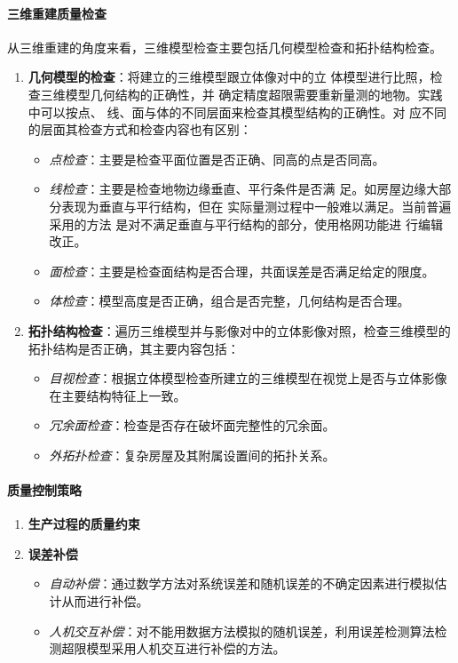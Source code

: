 \paragraph{三维重建质量检查}从三维重建的角度来看，三维模型检查主要包括几何模型检查和拓扑结构检查。
\begin{enumerate}
	\item \textbf{几何模型的检查}：将建立的三维模型跟立体像对中的立
		体模型进行比照，检查三维模型几何结构的正确性，并
		确定精度超限需要重新量测的地物。实践中可以按点、
		线、面与体的不同层面来检查其模型结构的正确性。对
		应不同的层面其检查方式和检查内容也有区别：
		\begin{itemize}
			\item \textit{点检查}：主要是检查平面位置是否正确、同高的点是否同高。
			\item \textit{线检查}：主要是检查地物边缘垂直、平行条件是否满
				足。如房屋边缘大部分表现为垂直与平行结构，但在
				实际量测过程中一般难以满足。当前普遍采用的方法
				是对不满足垂直与平行结构的部分，使用格网功能进
				行编辑改正。
			\item \textit{面检查}：主要是检查面结构是否合理，共面误差是否满足给定的限度。
			\item \textit{体检查}：模型高度是否正确，组合是否完整，几何结构是否合理。
		\end{itemize}
	\item \textbf{拓扑结构检查}：遍历三维模型并与影像对中的立体影像对照，检查三维模型的拓扑结构是否正确，其主要内容包括：
		\begin{itemize}
			\item \textit{目视检查}：根据立体模型检查所建立的三维模型在视觉上是否与立体影像在主要结构特征上一致。
			\item \textit{冗余面检查}：检查是否存在破坏面完整性的冗余面。
			\item \textit{外拓扑检查}：复杂房屋及其附属设置间的拓扑关系。
		\end{itemize}
\end{enumerate}

\paragraph{质量控制策略}
\begin{enumerate}
	\item \textbf{生产过程的质量约束}
	\item \textbf{误差补偿}
		\begin{itemize}
			\item \textit{自动补偿}：通过数学方法对系统误差和随机误差的不确定因素进行模拟估计从而进行补偿。
			\item \textit{人机交互补偿}：对不能用数据方法模拟的随机误差，利用误差检测算法检测超限模型采用人机交互进行补偿的方法。
		\end{itemize}
\end{enumerate}

